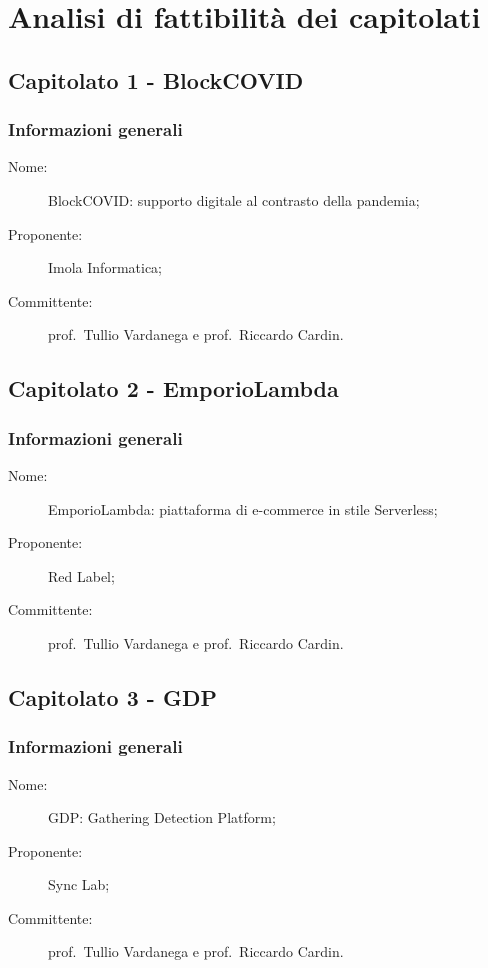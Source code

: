 \section{Analisi di fattibilità dei capitolati}

\subsection{Capitolato 1 - BlockCOVID}
\subsubsection{Informazioni generali}
\begin{description}
	\item[Nome:] BlockCOVID: supporto digitale al contrasto della pandemia;
	\item[Proponente:] Imola Informatica;
	\item[Committente:] prof.~Tullio Vardanega e prof.~Riccardo Cardin.
\end{description}

\subsection{Capitolato 2 - EmporioLambda}
\subsubsection{Informazioni generali}
\begin{description}
	\item[Nome:] EmporioLambda: piattaforma di e-commerce in stile Serverless;
	\item[Proponente:] Red Label;
	\item[Committente:] prof.~Tullio Vardanega e prof.~Riccardo Cardin.
\end{description}

\subsection{Capitolato 3 - GDP}
\subsubsection{Informazioni generali}
\begin{description}
	\item[Nome:] GDP: Gathering Detection Platform;
	\item[Proponente:] Sync Lab;
	\item[Committente:] prof.~Tullio Vardanega e prof.~Riccardo Cardin.
\end{description}

